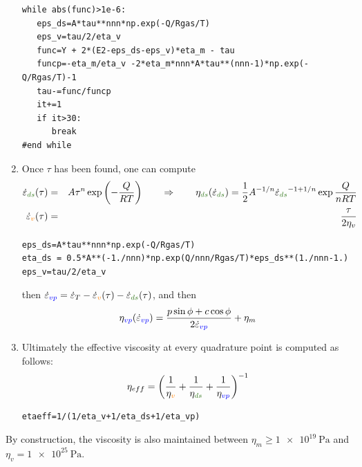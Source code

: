 \begin{enumerate}
\begin{lstlisting}
while abs(func)>1e-6:
   eps_ds=A*tau**nnn*np.exp(-Q/Rgas/T)
   eps_v=tau/2/eta_v
   func=Y + 2*(E2-eps_ds-eps_v)*eta_m - tau
   funcp=-eta_m/eta_v -2*eta_m*nnn*A*tau**(nnn-1)*np.exp(-Q/Rgas/T)-1
   tau-=func/funcp
   it+=1
   if it>30:
      break
#end while
\end{lstlisting}

\item Once $\tau$ has been found, one can compute 
\begin{eqnarray}
\dot{\varepsilon}_{\color{OliveGreen}ds}(\tau)&=&A \tau^n \exp \left(-\frac{Q}{RT}\right)
\qquad 
\Rightarrow 
\qquad 
\eta_{\color{OliveGreen}ds}(\dot\varepsilon_{\color{OliveGreen}ds}) 
= \frac{1}{2} A^{-1/n} \dot{\varepsilon}_{\color{OliveGreen}ds}^{-1+1/n} \exp \frac{Q}{nRT} \nn\\
\dot{\varepsilon}_{\color{orange}v}(\tau)&=&\frac{\tau}{2\eta_v}  \nn
\end{eqnarray}
\begin{lstlisting}
eps_ds=A*tau**nnn*np.exp(-Q/Rgas/T)
eta_ds = 0.5*A**(-1./nnn)*np.exp(Q/nnn/Rgas/T)*eps_ds**(1./nnn-1.)
eps_v=tau/2/eta_v
\end{lstlisting}
then 
$\dot{\varepsilon}_{\color{blue}vp}
=\dot{\varepsilon}_T 
-\dot{\varepsilon}_{\color{orange}v}(\tau) 
-\dot{\varepsilon}_{\color{OliveGreen}ds}(\tau)$,
and then 
\[
\eta_{\color{blue} vp}(\dot\varepsilon_{\color{blue} vp}) 
= \frac{p \sin \phi + c \cos \phi}{2 \dot{\varepsilon}_{\color{blue}vp}}  + \eta_{m}
\]
\item 
Ultimately the effective viscosity at every quadrature point is computed as follows:
\[
\eta_{eff} = \left(
\frac{1}{\eta_{\color{orange}v}} + 
\frac{1}{\eta_{\color{OliveGreen}ds}}  + 
\frac{1}{\eta_{\color{blue}vp}}  
\right)^{-1}
\]
\begin{lstlisting}
etaeff=1/(1/eta_v+1/eta_ds+1/eta_vp)
\end{lstlisting}

\end{enumerate}

 
By construction, the viscosity is also maintained between $\eta_{m}\ge \SI{1e19}{\pascal}$ 
and $\eta_{v}=\SI{1e25}{\pascal}$. 


